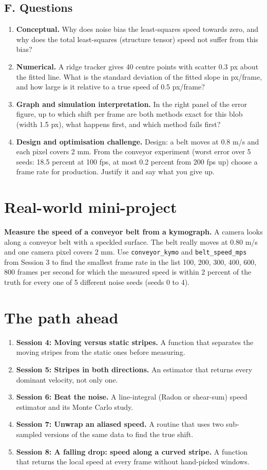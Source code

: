 \documentclass[11pt,a4paper]{article}
\begin{document}
\subsection*{F. Questions}
\begin{enumerate}[nosep]
\item \textbf{Conceptual.} Why does noise bias the least-squares speed towards zero, and why does the total least-squares (structure tensor) speed not suffer from this bias?
\item \textbf{Numerical.} A ridge tracker gives 40 centre points with scatter 0.3 px about the fitted line. What is the standard deviation of the fitted slope in px/frame, and how large is it relative to a true speed of 0.5 px/frame?
\item \textbf{Graph and simulation interpretation.} In the right panel of the error figure, up to which shift per frame are both methods exact for this blob (width 1.5 px), what happens first, and which method fails first?
\item \textbf{Design and optimisation challenge.} Design: a belt moves at 0.8 m/s and each pixel covers 2 mm. From the conveyor experiment (worst error over 5 seeds: 18.5 percent at 100 fps, at most 0.2 percent from 200 fps up) choose a frame rate for production. Justify it and say what you give up.
\end{enumerate}

\section{Real-world mini-project}
\textbf{Measure the speed of a conveyor belt from a kymograph.} A camera looks along a conveyor belt with a speckled surface. The belt really moves at 0.80 m/s and one camera pixel covers 2 mm. Use \texttt{conveyor\_kymo} and \texttt{belt\_speed\_mps} from Session 3 to find the smallest frame rate in the list 100, 200, 300, 400, 600, 800 frames per second for which the measured speed is within 2 percent of the truth for every one of 5 different noise seeds (seeds 0 to 4).

\section{The path ahead}
\begin{enumerate}[nosep]
\item \textbf{Session 4: Moving versus static stripes.} A function that separates the moving stripes from the static ones before measuring.
\item \textbf{Session 5: Stripes in both directions.} An estimator that returns every dominant velocity, not only one.
\item \textbf{Session 6: Beat the noise.} A line-integral (Radon or shear-sum) speed estimator and its Monte Carlo study.
\item \textbf{Session 7: Unwrap an aliased speed.} A routine that uses two sub-sampled versions of the same data to find the true shift.
\item \textbf{Session 8: A falling drop: speed along a curved stripe.} A function that returns the local speed at every frame without hand-picked windows.
\end{enumerate}
\end{document}
